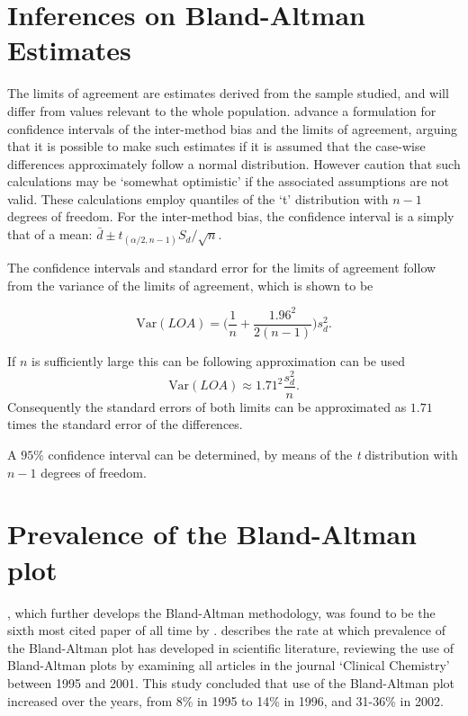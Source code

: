 \documentclass[12pt, a4paper]{report}
\theoremstyle{plain}
\theoremstyle{definition}
\theoremstyle{remark}
\begin{document}
\section{Inferences on Bland-Altman Estimates}
	The limits of agreement are estimates derived from the sample studied, and will differ from values relevant to the whole
	population. \citet*{BA86} advance a formulation for confidence
	intervals of the inter-method bias and the limits of agreement, arguing that it is possible to make such estimates if it is assumed that the case-wise differences approximately follow a normal distribution. However \citet*{BA99} caution that such calculations may be `somewhat
	optimistic' if the associated assumptions are not valid. These calculations employ quantiles of the `t' distribution with $n -1$ degrees of freedom. For the inter-method bias, the confidence interval is a simply that of a mean: $\bar{d} \pm t_{(\alpha/2,n-1)} S_{d}/\sqrt{n}$.
	
	The confidence intervals and standard error for the limits of agreement follow from the variance of the limits of agreement, which is shown to be
	
	\[
	\mbox{Var}(LOA) = \bigg(\frac{1}{n}+\frac{1.96^{2}}{2(n-1)}\bigg)s_{d}^{2}.
	\]
	
	If $n$ is sufficiently large this can be following approximation can be used
	\[
	\mbox{Var}(LOA) \approx 1.71^{2}\frac{s_{d}^{2}}{n}.
	\]
	Consequently the standard errors of both limits can be approximated as $1.71$ times the standard error of the differences.
	


A $95\%$ confidence interval can be determined, by means of the
\emph{t} distribution with $n-1$ degrees of freedom. 


		


\section{Prevalence of the Bland-Altman plot}

\citet*{BA86}, which further develops the Bland-Altman methodology,
was found to be the sixth most cited paper of all time by \citet{BAcite}. \cite{Dewitte} describes the rate at which
prevalence of the Bland-Altman plot has developed in scientific
literature, reviewing the use of Bland-Altman plots
by examining all articles in the journal `Clinical Chemistry'
between 1995 and 2001. This study concluded that use of the
Bland-Altman plot increased over the years, from 8\% in 1995 to
14\% in 1996, and 31-36\% in 2002.
\end{document}
